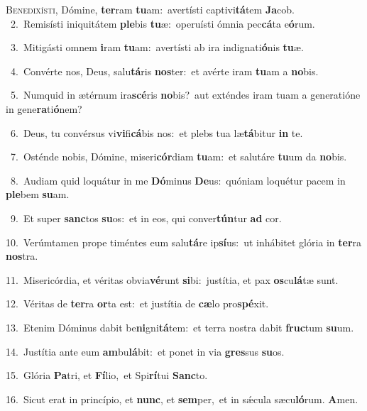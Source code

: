 \lettrine{\initial\textcolor{\initialcolor}{B}}{enedixísti,} Dómine, \textbf{ter}\-ram \textbf{tu}\-am:~\star avertísti captivi\-\textbf{tá}\-tem \textbf{Ja}\-cob.\\
{\numbfont\textcolor{\numbcolor}{~2.}}~Remisísti iniquitátem \textbf{ple}\-bis \textbf{tu}\-æ:~\star operuísti ómnia pec\-\textbf{cá}\-ta e\-\textbf{ó}\-rum.\par
{\numbfont\textcolor{\numbcolor}{~3.}}~Mitigásti omnem \textbf{i}\-ram \textbf{tu}\-am:~\star avertísti ab ira indignati\-\textbf{ó}\-nis \textbf{tu}\-æ.\par
{\numbfont\textcolor{\numbcolor}{~4.}}~Convérte nos, Deus, salu\-\textbf{tá}\-ris \textbf{nos}\-ter:~\star et avérte iram \textbf{tu}\-am a \textbf{no}\-bis.\par
{\numbfont\textcolor{\numbcolor}{~5.}}~Numquid in ætérnum ira\-\textbf{scé}\-ris \textbf{no}\-bis?~\star aut exténdes iram tuam a generatióne in gene\-\textbf{ra}\-ti\-\textbf{ó}\-nem?\par
{\numbfont\textcolor{\numbcolor}{~6.}}~Deus, tu convérsus vi\-\textbf{vi}\-fi\-\textbf{cá}\-bis nos:~\star et plebs tua læ\-\textbf{tá}\-bitur \textbf{in} te.\par
{\numbfont\textcolor{\numbcolor}{~7.}}~Osténde nobis, Dómine, miseri\-\textbf{cór}\-diam \textbf{tu}\-am:~\star et salutáre \textbf{tu}\-um da \textbf{no}\-bis.\par
{\numbfont\textcolor{\numbcolor}{~8.}}~Audiam quid loquátur in me \textbf{Dó}\-minus \textbf{De}\-us:~\star quóniam loquétur pacem in \textbf{ple}\-bem \textbf{su}\-am.\par
{\numbfont\textcolor{\numbcolor}{~9.}}~Et super \textbf{sanc}\-tos \textbf{su}\-os:~\star et in eos, qui conver\-\textbf{tún}\-tur \textbf{ad} cor.\par
{\numbfont\textcolor{\numbcolor}{10.}}~Verúmtamen prope timéntes eum salu\-\textbf{tá}\-re ip\-\textbf{sí}\-us:~\star ut inhábitet glória in \textbf{ter}\-ra \textbf{nos}\-tra.\par
{\numbfont\textcolor{\numbcolor}{11.}}~Misericórdia, et véritas obvia\-\textbf{vé}\-runt \textbf{si}\-bi:~\star justítia, et pax \textbf{os}\-cu\-\textbf{lá}\-tæ sunt.\par
{\numbfont\textcolor{\numbcolor}{12.}}~Véritas de \textbf{ter}\-ra \textbf{or}\-ta est:~\star et justítia de \textbf{cæ}\-lo pro\-\textbf{spé}\-xit.\par
{\numbfont\textcolor{\numbcolor}{13.}}~Etenim Dóminus dabit be\-\textbf{ni}\-gni\-\textbf{tá}\-tem:~\star et terra nostra dabit \textbf{fruc}\-tum \textbf{su}\-um.\par
{\numbfont\textcolor{\numbcolor}{14.}}~Justítia ante eum \textbf{am}\-bu\-\textbf{lá}\-bit:~\star et ponet in via \textbf{gres}\-sus \textbf{su}\-os.\par
{\numbfont\textcolor{\numbcolor}{15.}}~Glória \textbf{Pa}\-tri, et \textbf{Fí}\-lio,~\star et Spi\-\textbf{rí}\-tui \textbf{Sanc}\-to.\par
{\numbfont\textcolor{\numbcolor}{16.}}~Sicut erat in princípio, et \textbf{nunc}\-, et \textbf{sem}\-per,~\star et in sǽcula sæcu\-\textbf{ló}\-rum. \textbf{A}\-men.\par
